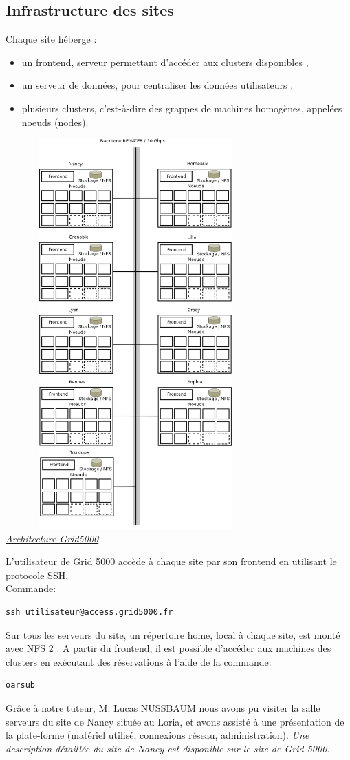   \subsection{Infrastructure des sites}
Chaque site héberge :
\begin{itemize}
\item un frontend, serveur permettant d'accéder aux clusters disponibles ,
\item un serveur de données, pour centraliser les données utilisateurs ,
\item plusieurs clusters, c'est-à-dire des grappes de machines homogènes, appelées noeuds (nodes).
\end{itemize}
\begin{center}
\includegraphics[width=10cm,height=15cm]{images/g5k1.png}
\\
\underline{\textit{Architecture Grid5000}}
\end{center}
L'utilisateur de Grid 5000 accède à chaque site par son frontend en utilisant le protocole SSH.\\
Commande:
\begin{lstlisting}
ssh utilisateur@access.grid5000.fr
\end{lstlisting}
Sur tous les serveurs du site, un répertoire home, local à chaque site, est monté avec NFS 2 .
A partir du frontend, il est possible d'accéder aux machines des clusters en exécutant des réservations à l'aide de la commande:
\begin{lstlisting}
oarsub
\end{lstlisting}
Grâce à notre tuteur, M. Lucas NUSSBAUM nous avons pu visiter la salle serveurs du site de Nancy située au Loria, 
et avons assisté à une présentation de la plate-forme (matériel utilisé, connexions réseau,
administration).
\quotation\textit{Une description détaillée du site de Nancy est disponible sur le site de Grid 5000.}

